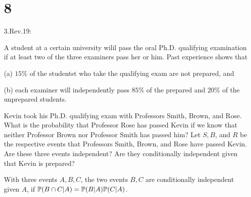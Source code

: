 \documentclass{article}
\begin{document}
\section*{8}
\begin{ques}\label{q8}
    3.Rev.19:

    A student at a certain university wilil pass the oral Ph.D. qualifying examination if at least two of the three examiners pass her or him. Past experience shows that 
    
    (a) $15\%$ of the studentst who take the qualifying exam are not prepared, and

    (b) each examiner will independently pass $85\%$ of the prepared and $20\%$ of the unprepared students.

    Kevin took his Ph.D. qualifying exam with Professors Smith, Brown, and Rose. What is the probability that Professor Rose has passed Kevin if we know that neither Professor Brown nor Professor Smith has passed him? Let $S,B$, and $R$ be the respective events that Professors Smith, Brown, and Rose have passed Kevin. Are these three events independent? Are they conditionally independent given that Kevin is prepared?

    \begin{defn}
        With three events $A,B,C$, the two events $B,C$ are conditionally independent given $A$, if $\mathbb{P}(B\cap C | A)=\mathbb{P}(B|A)\mathbb{P}(C|A)$.
    \end{defn}
\end{ques}
\end{document}
